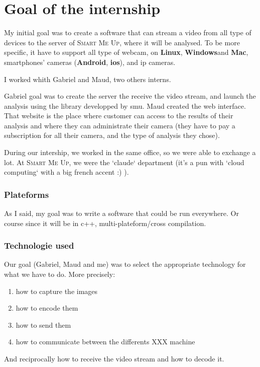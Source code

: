 \documentclass[a4paper,11pt]{custom}
\newcommand{\smu}{\textsc{Smart Me Up}}
\newcommand{\linux}{\textbf{Linux}}
\newcommand{\win}{\textbf{Windows}}
\newcommand{\mac}{\textbf{Mac}}
\newcommand{\android}{\textbf{Android}}
\newcommand{\ios}{\textbf{ios}}
\begin{document}
\chapter{Goal of the internship}

My initial goal was to create a software that can stream a video from all type of
devices to the server of \smu, where it will be analysed. To be more specific,
it have to support all type of webcam, on \linux, \win and \mac, smartphones'
cameras (\android, \ios), and ip cameras.

I worked whith Gabriel and Maud, two others interns.

Gabriel goal was to create the server the receive the video stream, and launch
the analysis using the library developped by smu.
Maud created the web interface. That website is the place where customer can
access to the results of their analysis and where they can administrate their
camera (they have to pay a subscription for all their camera, and the type of
analysis they chose).

During our intership, we worked in the same office, so we were able to exchange
a lot. At \smu, we were the `claude` department (it's a pun with `cloud
computing` with a big french accent :) ).

\subsection{Plateforms}

As I said, my goal was to write a software that could be run everywhere. Or
course since it will be in c++, 
multi-plateform/cross compilation.

\subsection{Technologie used}

Our goal (Gabriel, Maud and me) was to select the appropriate technology for
what we have to do. More precisely:
\begin{enumerate}
\item how to capture the images
\item how to encode them
\item how to send them
\item how to communicate between the differents XXX machine
\end{enumerate}
And reciprocally how to receive the video stream and how to decode it.
\end{document}

